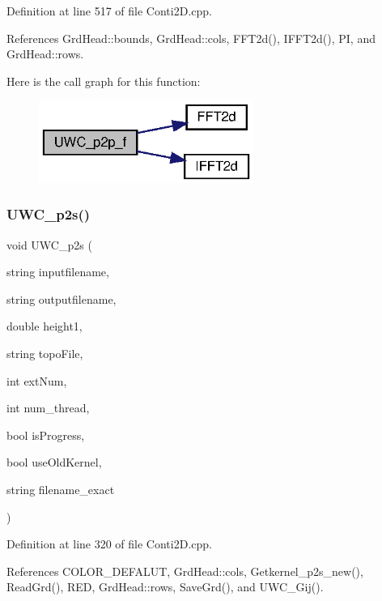 Definition at line 517 of file Conti2\+D.\+cpp.



References Grd\+Head\+::bounds, Grd\+Head\+::cols, F\+F\+T2d(), I\+F\+F\+T2d(), PI, and Grd\+Head\+::rows.

Here is the call graph for this function\+:\nopagebreak
\begin{figure}[H]
\begin{center}
\leavevmode
\includegraphics[width=199pt]{Conti2D_8cpp_a016dc620865e33635aabc81c129eac30_a016dc620865e33635aabc81c129eac30_cgraph}
\end{center}
\end{figure}
\mbox{\label{Conti2D_8cpp_af8adb87017663774bfd342b39facc828_af8adb87017663774bfd342b39facc828}} 
\subsubsection{U\+W\+C\+\_\+p2s()}
{\footnotesize\ttfamily void U\+W\+C\+\_\+p2s (\begin{DoxyParamCaption}\item[{string}]{inputfilename,  }\item[{string}]{outputfilename,  }\item[{double}]{height1,  }\item[{string}]{topo\+File,  }\item[{int}]{ext\+Num,  }\item[{int}]{num\+\_\+thread,  }\item[{bool}]{is\+Progress,  }\item[{bool}]{use\+Old\+Kernel,  }\item[{string}]{filename\+\_\+exact }\end{DoxyParamCaption})}



Definition at line 320 of file Conti2\+D.\+cpp.



References C\+O\+L\+O\+R\+\_\+\+D\+E\+F\+A\+L\+UT, Grd\+Head\+::cols, Getkernel\+\_\+p2s\+\_\+new(), Read\+Grd(), R\+ED, Grd\+Head\+::rows, Save\+Grd(), and U\+W\+C\+\_\+\+Gij().



